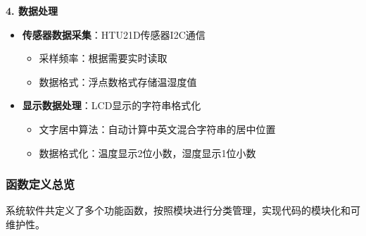 \textbf{4. 数据处理}
\begin{itemize}
    \vspace{-6pt}
  \item \textbf{传感器数据采集}：HTU21D传感器I2C通信
    \begin{itemize}
        \vspace{-3pt}
      \item 采样频率：根据需要实时读取
        \vspace{-3pt}
      \item 数据格式：浮点数格式存储温湿度值
    \end{itemize}
    \vspace{-6pt}
  \item \textbf{显示数据处理}：LCD显示的字符串格式化
    \begin{itemize}
        \vspace{-3pt}
      \item 文字居中算法：自动计算中英文混合字符串的居中位置
        \vspace{-3pt}
      \item 数据格式化：温度显示2位小数，湿度显示1位小数
    \end{itemize}
\end{itemize}

\subsubsection{函数定义总览}

\qquad 系统软件共定义了多个功能函数，按照模块进行分类管理，实现代码的模块化和可维护性。

